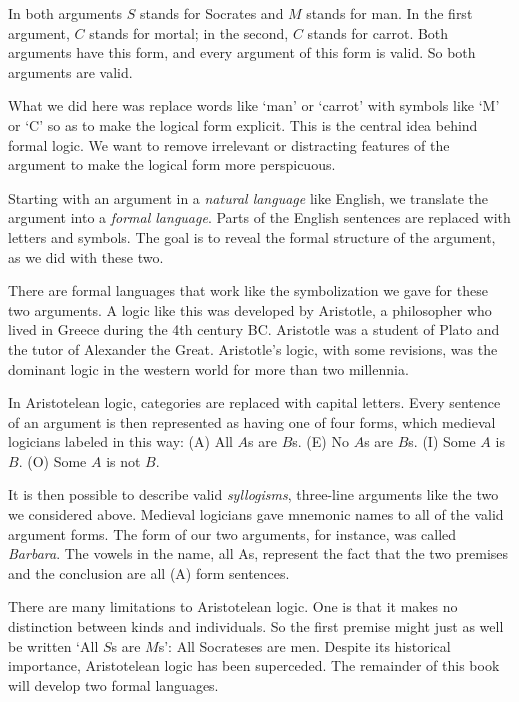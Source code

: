 In both arguments $S$ stands for Socrates and $M$ stands for man. In the first argument, $C$ stands for mortal; in the second, $C$ stands for carrot. Both arguments have this form, and every argument of this form is valid. So both arguments are valid.


What we did here was replace words like `man' or `carrot' with symbols like `M' or `C' so as to make the logical form explicit. This is the central idea behind formal logic. We want to remove irrelevant or distracting features of the argument to make the logical form more perspicuous.


Starting with an argument in a \emph{natural language} like English, we translate the argument into a \emph{formal language}. Parts of the English sentences are replaced with letters and symbols. The goal is to reveal the formal structure of the argument, as we did with these two.

There are formal languages that work like the symbolization we gave for these two arguments. A logic like this was developed by Aristotle, a philosopher who lived in Greece during the 4th century BC. Aristotle was a student of Plato and the tutor of Alexander the Great. Aristotle's logic, with some revisions, was the dominant logic in the western world for more than two millennia.

In Aristotelean logic, categories are replaced with capital letters. Every sentence of an argument is then represented as having one of four forms, which medieval logicians labeled in this way: (A) All $A$s are $B$s. (E) No $A$s are $B$s. (I) Some $A$ is $B$. (O) Some $A$ is not $B$.

It is then possible to describe valid \emph{syllogisms}, three-line arguments like the two we considered above. Medieval logicians gave mnemonic names to all of the valid argument forms. The form of our two arguments, for instance, was called \emph{Barbara}. The vowels in the name, all As, represent the fact that the two premises and the conclusion are all (A) form sentences.

There are many limitations to Aristotelean logic. One is that it makes no distinction between kinds and individuals. So the first premise might just as well be written `All $S$s are $M$s': All Socrateses are men. Despite its historical importance, Aristotelean logic has been superceded. The remainder of this book will develop two formal languages.

